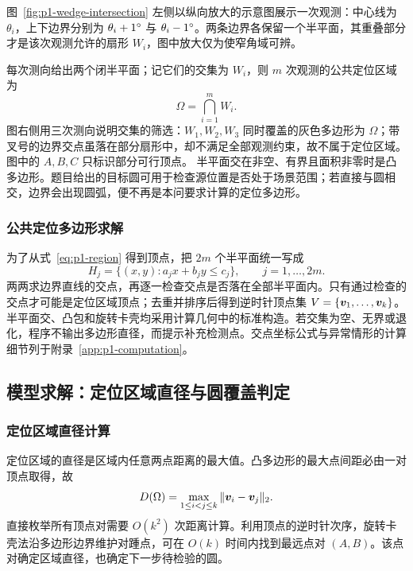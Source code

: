 图~\ref{fig:p1-wedge-intersection} 左侧以纵向放大的示意图展示一次观测：中心线为 \(\theta_i\)，上下边界分别为 \(\theta_i+1^{\circ}\) 与 \(\theta_i-1^{\circ}\)。两条边界各保留一个半平面，其重叠部分才是该次观测允许的扇形 \(W_i\)，图中放大仅为使窄角域可辨。

每次测向给出两个闭半平面；记它们的交集为 \(W_i\)，则 \(m\) 次观测的公共定位区域为
\begin{equation}
  \Omega=\bigcap_{i=1}^{m}W_i.
  \label{eq:p1-region}
\end{equation}
图右侧用三次测向说明交集的筛选：\(W_1,W_2,W_3\) 同时覆盖的灰色多边形为 \(\Omega\)；带叉号的边界交点虽落在部分扇形中，却不满足全部观测约束，故不属于定位区域。图中的 \(A,B,C\) 只标识部分可行顶点。
半平面交在非空、有界且面积非零时是凸多边形。题目给出的目标圆可用于检查源位置是否处于场景范围；若直接与圆相交，边界会出现圆弧，便不再是本问要求计算的定位多边形。

\subsubsection{公共定位多边形求解}

为了从式~\eqref{eq:p1-region} 得到顶点，把 \(2m\) 个半平面统一写成
\begin{equation}
  H_j=\{(x,y):a_jx+b_jy\le c_j\},\qquad j=1,\ldots,2m.
\end{equation}
两两求边界直线的交点，再逐一检查交点是否落在全部半平面内。只有通过检查的交点才可能是定位区域顶点；去重并排序后得到逆时针顶点集 \(V=\{\bm{v}_1,\ldots,\bm{v}_k\}\)。半平面交、凸包和旋转卡壳均采用计算几何中的标准构造\cite{computationalGeometry}。若交集为空、无界或退化，程序不输出多边形直径，而提示补充检测点。交点坐标公式与异常情形的计算细节列于附录~\ref{app:p1-computation}。

\subsection{模型求解：定位区域直径与圆覆盖判定}

\subsubsection{定位区域直径计算}

定位区域的直径是区域内任意两点距离的最大值。凸多边形的最大点间距必由一对顶点取得，故
\begin{equation}
  D(\Omega)=\max_{1\le i<j\le k}
  \|\bm{v}_i-\bm{v}_j\|_2.
  \label{eq:p1-diameter}
\end{equation}
直接枚举所有顶点对需要 \(O(k^2)\) 次距离计算。利用顶点的逆时针次序，旋转卡壳法沿多边形边界维护对踵点，可在 \(O(k)\) 时间内找到最远点对 \((A,B)\)。该点对确定区域直径，也确定下一步待检验的圆。

